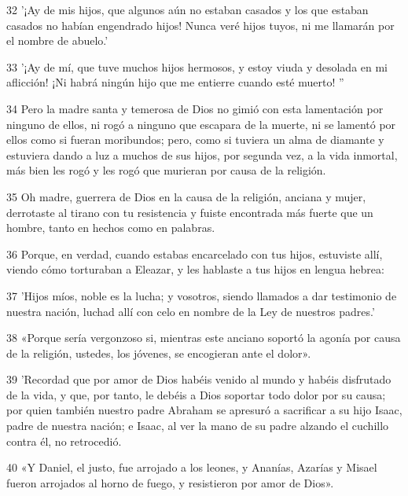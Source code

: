 \par 32 '¡Ay de mis hijos, que algunos aún no estaban casados ​​y los que estaban casados ​​no habían engendrado hijos! Nunca veré hijos tuyos, ni me llamarán por el nombre de abuelo.'

\par 33 '¡Ay de mí, que tuve muchos hijos hermosos, y estoy viuda y desolada en mi aflicción! ¡Ni habrá ningún hijo que me entierre cuando esté muerto! ''

\par 34 Pero la madre santa y temerosa de Dios no gimió con esta lamentación por ninguno de ellos, ni rogó a ninguno que escapara de la muerte, ni se lamentó por ellos como si fueran moribundos; pero, como si tuviera un alma de diamante y estuviera dando a luz a muchos de sus hijos, por segunda vez, a la vida inmortal, más bien les rogó y les rogó que murieran por causa de la religión.

\par 35 Oh madre, guerrera de Dios en la causa de la religión, anciana y mujer, derrotaste al tirano con tu resistencia y fuiste encontrada más fuerte que un hombre, tanto en hechos como en palabras.

\par 36 Porque, en verdad, cuando estabas encarcelado con tus hijos, estuviste allí, viendo cómo torturaban a Eleazar, y les hablaste a tus hijos en lengua hebrea:

\par 37 'Hijos míos, noble es la lucha; y vosotros, siendo llamados a dar testimonio de nuestra nación, luchad allí con celo en nombre de la Ley de nuestros padres.'

\par 38 «Porque sería vergonzoso si, mientras este anciano soportó la agonía por causa de la religión, ustedes, los jóvenes, se encogieran ante el dolor».

\par 39 'Recordad que por amor de Dios habéis venido al mundo y habéis disfrutado de la vida, y que, por tanto, le debéis a Dios soportar todo dolor por su causa; por quien también nuestro padre Abraham se apresuró a sacrificar a su hijo Isaac, padre de nuestra nación; e Isaac, al ver la mano de su padre alzando el cuchillo contra él, no retrocedió.

\par 40 «Y Daniel, el justo, fue arrojado a los leones, y Ananías, Azarías y Misael fueron arrojados al horno de fuego, y resistieron por amor de Dios».

